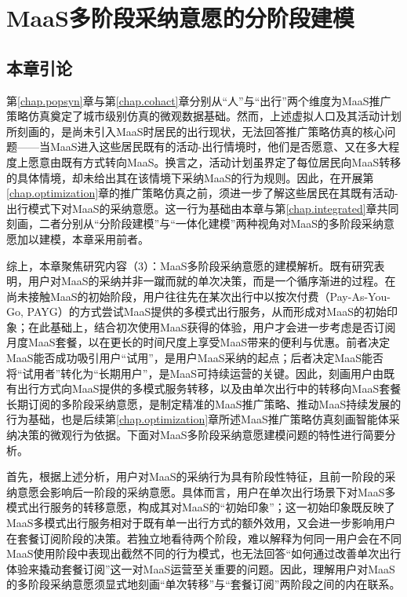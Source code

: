 \setlength{\baselineskip}{20pt}
\chapter{MaaS多阶段采纳意愿的分阶段建模}\label{chap.staged}

\section{本章引论}\label{sec.staged.intro}

第\ref{chap.popsyn}章与第\ref{chap.cohact}章分别从``人''与``出行''两个维度为MaaS推广策略仿真奠定了城市级别仿真的微观数据基础。然而，上述虚拟人口及其活动计划所刻画的，是尚未引入MaaS时居民的出行现状，无法回答推广策略仿真的核心问题——当MaaS进入这些居民既有的活动-出行情境时，他们是否愿意、又在多大程度上愿意由既有方式转向MaaS。换言之，活动计划虽界定了每位居民向MaaS转移的具体情境，却未给出其在该情境下采纳MaaS的行为规则。因此，在开展第\ref{chap.optimization}章的推广策略仿真之前，须进一步了解这些居民在其既有活动-出行模式下对MaaS的采纳意愿。这一行为基础由本章与第\ref{chap.integrated}章共同刻画，二者分别从``分阶段建模''与``一体化建模''两种视角对MaaS的多阶段采纳意愿加以建模，本章采用前者。

综上，本章聚焦研究内容（3）：MaaS多阶段采纳意愿的建模解析。既有研究表明，用户对MaaS的采纳并非一蹴而就的单次决策，而是一个循序渐进的过程。在尚未接触MaaS的初始阶段，用户往往先在某次出行中以按次付费（Pay-As-You-Go, PAYG）的方式尝试MaaS提供的多模式出行服务，从而形成对MaaS的初始印象\citep{hoDriversParticipantsChoices2021}；在此基础上，结合初次使用MaaS获得的体验，用户才会进一步考虑是否订阅月度MaaS套餐\citep{matyasInvestigatingHeterogeneityPreferences2021}，以在更长的时间尺度上享受MaaS带来的便利与优惠\citep{matyasInvestigatingHeterogeneityPreferences2021}。前者决定MaaS能否成功吸引用户``试用''，是用户MaaS采纳的起点；后者决定MaaS能否将``试用者''转化为``长期用户''，是MaaS可持续运营的关键。因此，刻画用户由既有出行方式向MaaS提供的多模式服务转移，以及由单次出行中的转移向MaaS套餐长期订阅的多阶段采纳意愿，是制定精准的MaaS推广策略、推动MaaS持续发展的行为基础，也是后续第\ref{chap.optimization}章所述MaaS推广策略仿真刻画智能体采纳决策的微观行为依据。下面对MaaS多阶段采纳意愿建模问题的特性进行简要分析。

首先，根据上述分析，用户对MaaS的采纳行为具有阶段性特征，且前一阶段的采纳意愿会影响后一阶段的采纳意愿。具体而言，用户在单次出行场景下对MaaS多模式出行服务的转移意愿，构成其对MaaS的``初始印象''；这一初始印象既反映了MaaS多模式出行服务相对于既有单一出行方式的额外效用，又会进一步影响用户在套餐订阅阶段的决策\citep{liuUnderstandingImpactOccasional2023}。若独立地看待两个阶段，难以解释为何同一用户会在不同MaaS使用阶段中表现出截然不同的行为模式，也无法回答``如何通过改善单次出行体验来撬动套餐订阅''这一对MaaS运营至关重要的问题。因此，理解用户对MaaS的多阶段采纳意愿须显式地刻画``单次转移''与``套餐订阅''两阶段之间的内在联系。

